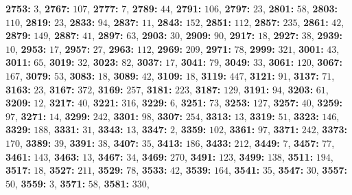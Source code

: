 \textsf{\bfseries 2753:} $3$, \textsf{\bfseries 2767:} $107$, \textsf{\bfseries 2777:} $7$, \textsf{\bfseries 2789:} $44$, \textsf{\bfseries 2791:} $106$, \textsf{\bfseries 2797:} $23$, \textsf{\bfseries 2801:} $58$, \textsf{\bfseries 2803:} $110$, \textsf{\bfseries 2819:} $23$, \textsf{\bfseries 2833:} $94$, \textsf{\bfseries 2837:} $11$, \textsf{\bfseries 2843:} $152$, \textsf{\bfseries 2851:} $112$, \textsf{\bfseries 2857:} $235$, \textsf{\bfseries 2861:} $42$, \textsf{\bfseries 2879:} $149$, \textsf{\bfseries 2887:} $41$, \textsf{\bfseries 2897:} $63$, \textsf{\bfseries 2903:} $30$, \textsf{\bfseries 2909:} $90$, \textsf{\bfseries 2917:} $18$, \textsf{\bfseries 2927:} $38$, \textsf{\bfseries 2939:} $10$, \textsf{\bfseries 2953:} $17$, \textsf{\bfseries 2957:} $27$, \textsf{\bfseries 2963:} $112$, \textsf{\bfseries 2969:} $209$, \textsf{\bfseries 2971:} $78$, \textsf{\bfseries 2999:} $321$, \textsf{\bfseries 3001:} $43$, \textsf{\bfseries 3011:} $65$, \textsf{\bfseries 3019:} $32$, \textsf{\bfseries 3023:} $82$, \textsf{\bfseries 3037:} $17$, \textsf{\bfseries 3041:} $79$, \textsf{\bfseries 3049:} $33$, \textsf{\bfseries 3061:} $120$, \textsf{\bfseries 3067:} $167$, \textsf{\bfseries 3079:} $53$, \textsf{\bfseries 3083:} $18$, \textsf{\bfseries 3089:} $42$, \textsf{\bfseries 3109:} $18$, \textsf{\bfseries 3119:} $447$, \textsf{\bfseries 3121:} $91$, \textsf{\bfseries 3137:} $71$, \textsf{\bfseries 3163:} $23$, \textsf{\bfseries 3167:} $372$, \textsf{\bfseries 3169:} $257$, \textsf{\bfseries 3181:} $223$, \textsf{\bfseries 3187:} $129$, \textsf{\bfseries 3191:} $94$, \textsf{\bfseries 3203:} $61$, \textsf{\bfseries 3209:} $12$, \textsf{\bfseries 3217:} $40$, \textsf{\bfseries 3221:} $316$, \textsf{\bfseries 3229:} $6$, \textsf{\bfseries 3251:} $73$, \textsf{\bfseries 3253:} $127$, \textsf{\bfseries 3257:} $40$, \textsf{\bfseries 3259:} $97$, \textsf{\bfseries 3271:} $14$, \textsf{\bfseries 3299:} $242$, \textsf{\bfseries 3301:} $98$, \textsf{\bfseries 3307:} $254$, \textsf{\bfseries 3313:} $13$, \textsf{\bfseries 3319:} $51$, \textsf{\bfseries 3323:} $146$, \textsf{\bfseries 3329:} $188$, \textsf{\bfseries 3331:} $31$, \textsf{\bfseries 3343:} $13$, \textsf{\bfseries 3347:} $2$, \textsf{\bfseries 3359:} $102$, \textsf{\bfseries 3361:} $97$, \textsf{\bfseries 3371:} $242$, \textsf{\bfseries 3373:} $170$, \textsf{\bfseries 3389:} $39$, \textsf{\bfseries 3391:} $38$, \textsf{\bfseries 3407:} $35$, \textsf{\bfseries 3413:} $186$, \textsf{\bfseries 3433:} $212$, \textsf{\bfseries 3449:} $7$, \textsf{\bfseries 3457:} $77$, \textsf{\bfseries 3461:} $143$, \textsf{\bfseries 3463:} $13$, \textsf{\bfseries 3467:} $34$, \textsf{\bfseries 3469:} $270$, \textsf{\bfseries 3491:} $123$, \textsf{\bfseries 3499:} $138$, \textsf{\bfseries 3511:} $194$, \textsf{\bfseries 3517:} $18$, \textsf{\bfseries 3527:} $211$, \textsf{\bfseries 3529:} $78$, \textsf{\bfseries 3533:} $42$, \textsf{\bfseries 3539:} $164$, \textsf{\bfseries 3541:} $35$, \textsf{\bfseries 3547:} $30$, \textsf{\bfseries 3557:} $50$, \textsf{\bfseries 3559:} $3$, \textsf{\bfseries 3571:} $58$, \textsf{\bfseries 3581:} $330$, 
